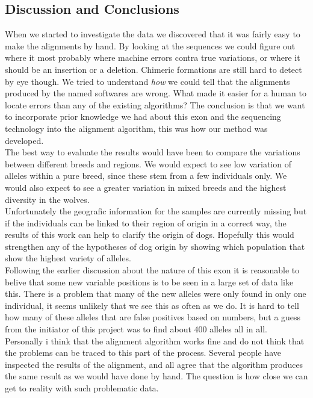 \subsection{Discussion and Conclusions}

When we started to investigate the data we discovered that it was fairly easy to make the alignments by hand. By looking at the sequences we could figure out where it most probably where machine errors contra true variations, or where it should be an insertion or a deletion. Chimeric formations are still hard to detect by eye though. We tried to understand \emph{how} we could tell that the alignments produced by the named softwares are wrong. What made it easier for a human to locate errors than any of the existing algorithms? The conclusion is that we want to incorporate prior knowledge we had about this exon and the sequencing technology into the alignment algorithm, this was how our method was developed.\\

The best way to evaluate the results would have been to compare the variations between different breeds and regions. We would expect to see low variation of alleles within a pure breed, since these stem from a few individuals only. We would also expect to see a greater variation in mixed breeds and the highest diversity in the wolves.\\
Unfortunately the geografic information for the samples are currently missing but if the individuals can be linked to their region of origin in a correct way, the results of this work can help to clarify the origin of dogs. Hopefully this would strengthen any of the hypotheses of dog origin by showing which population that show the highest variety of alleles.\\

Following the earlier discussion about the nature of this exon it is reasonable to belive that some new variable positions is to be seen in a large set of data like this. There is a problem that many of the new alleles were only found in only one individual, it seems unlikely that we see this as often as we do. It is hard to tell how many of these alleles that are false positives based on numbers, but a guess from the initiator of this project was to find about 400 alleles all in all.\\


Personally i think that the alignment algorithm works fine and do not think that the problems can be traced to this part of the process. Several people have inspected the results of the alignment, and all agree that the algorithm produces the same result as we would have done by hand. The question is how close we can get to reality with such problematic data.\\
